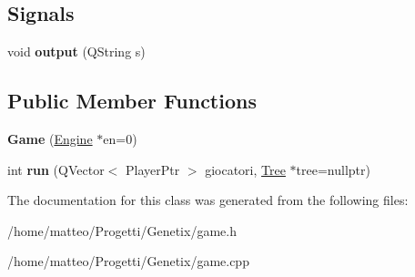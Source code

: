 \subsection*{Signals}
\begin{DoxyCompactItemize}
\item 
\mbox{\label{classGame_a6929ad70cc568687785588a6b5c6d7fc}} 
void {\bfseries output} (Q\+String s)
\end{DoxyCompactItemize}
\subsection*{Public Member Functions}
\begin{DoxyCompactItemize}
\item 
\mbox{\label{classGame_a9ea8a3f89f329d2017ef2eec89b58e37}} 
{\bfseries Game} (\hyperlink{classEngine}{Engine} $\ast$en=0)
\item 
\mbox{\label{classGame_ae31971102f3d122d79d7da1a5672deb5}} 
int {\bfseries run} (Q\+Vector$<$ Player\+Ptr $>$ giocatori, \hyperlink{classTree}{Tree} $\ast$tree=nullptr)
\end{DoxyCompactItemize}


The documentation for this class was generated from the following files\+:\begin{DoxyCompactItemize}
\item 
/home/matteo/\+Progetti/\+Genetix/game.\+h\item 
/home/matteo/\+Progetti/\+Genetix/game.\+cpp\end{DoxyCompactItemize}
